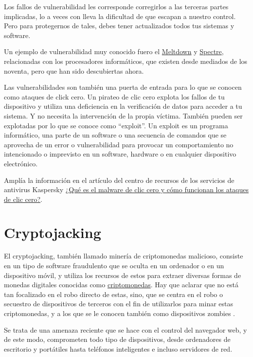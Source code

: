 \documentclass[
  a4paper,
  openany]{book}
\begin{document}
Los fallos de vulnerabilidad les corresponde corregirlos a las terceras partes implicadas, lo a veces con lleva la dificultad de que escapan a nuestro control. Pero para protegernos de tales, debes tener actualizados todos tus sistemas y software.

Un ejemplo de vulnerabilidad muy conocido fuero el \href{https://es.wikipedia.org/wiki/Meltdown_(vulnerabilidad)}{Meltdown} y \href{https://es.wikipedia.org/wiki/Spectre_(vulnerabilidad)}{Spectre}, relacionadas con los procesadores informáticos, que existen desde mediados de los noventa, pero que han sido descubiertas ahora.

Las vulnerabilidades son también una puerta de entrada para lo que se conocen como ataques de click cero. Un pirateo de clic cero explota los fallos de tu dispositivo y utiliza una deficiencia en la verificación de datos para acceder a tu sistema. Y no necesita la intervención de la propia víctima. También pueden ser explotadas por lo que se conoce como ``exploit''. Un exploit es un programa informático, una parte de un software o una secuencia de comandos que se aprovecha de un error o vulnerabilidad para provocar un comportamiento no intencionado o imprevisto en un software, hardware o en cualquier dispositivo electrónico.

Amplía la información en el artículo del centro de recursos de los servicios de antivirus Kaspersky \href{https://www.kaspersky.es/resource-center/definitions/what-is-zero-click-malware}{¿Qué es el malware de clic cero y cómo funcionan los ataques de clic cero?}.

\hypertarget{cryptojacking}{%
\section{Cryptojacking}\label{cryptojacking}}

El cryptojacking, también llamado minería de criptomonedas malicioso, consiste en un tipo de software fraudulento que se oculta en un ordenador o en un dispositivo móvil, y utiliza los recursos de estos para extraer diversas formas de monedas digitales conocidas como \href{https://es.wikipedia.org/wiki/Criptomoneda}{criptomonedas}. Hay que aclarar que no está tan focalizado en el robo directo de estas, sino, que se centra en el robo o secuestro de dispositivos de terceros con el fin de utilizarlos para minar estas criptomonedas, y a los que se le conocen también como dispositivos zombies \citep{cryptojacking}.

Se trata de una amenaza reciente que se hace con el control del navegador web, y de este modo, comprometen todo tipo de dispositivos, desde ordenadores de escritorio y portátiles hasta teléfonos inteligentes e incluso servidores de red.
\end{document}
